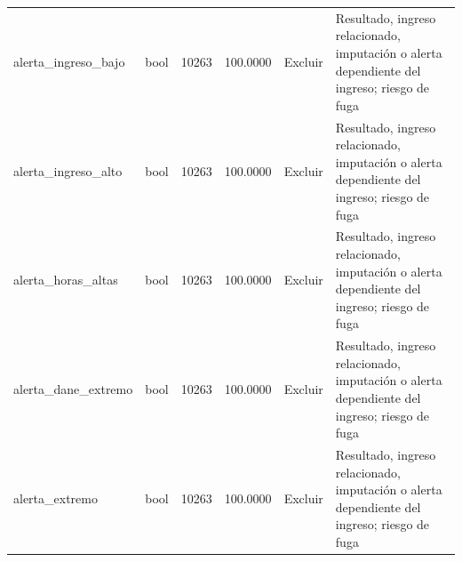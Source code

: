 \begin{longtable}{llrrll}
alerta\_ingreso\_bajo & bool & 10263 & 100.0000 & Excluir & Resultado, ingreso relacionado, imputación o alerta dependiente del ingreso; riesgo de fuga \\
alerta\_ingreso\_alto & bool & 10263 & 100.0000 & Excluir & Resultado, ingreso relacionado, imputación o alerta dependiente del ingreso; riesgo de fuga \\
alerta\_horas\_altas & bool & 10263 & 100.0000 & Excluir & Resultado, ingreso relacionado, imputación o alerta dependiente del ingreso; riesgo de fuga \\
alerta\_dane\_extremo & bool & 10263 & 100.0000 & Excluir & Resultado, ingreso relacionado, imputación o alerta dependiente del ingreso; riesgo de fuga \\
alerta\_extremo & bool & 10263 & 100.0000 & Excluir & Resultado, ingreso relacionado, imputación o alerta dependiente del ingreso; riesgo de fuga \\
\end{longtable}
